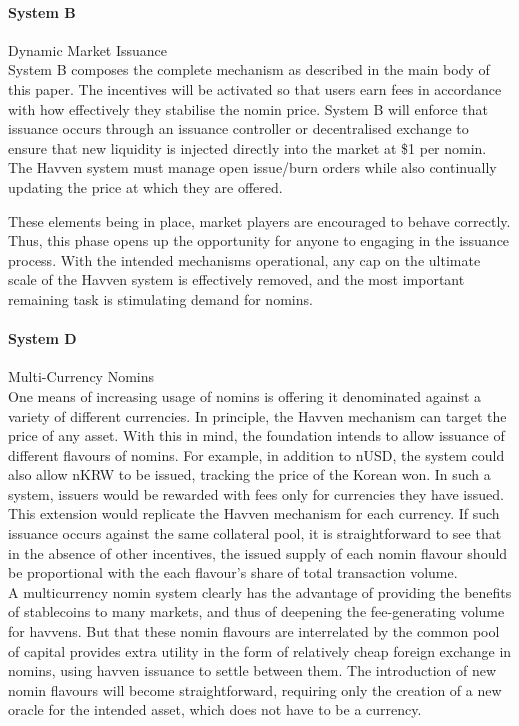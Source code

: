 \paragraph{System B} Dynamic Market Issuance \\

\noindent System B composes the complete mechanism as described in the main body
of this paper. The incentives will be activated so that users earn fees in
accordance with how effectively they stabilise the nomin price. 
System B will enforce that issuance occurs through an issuance controller or
decentralised exchange to ensure that new liquidity is injected directly
into the market at \$1 per nomin. The Havven system must manage open
issue/burn orders while also continually updating the price at which they are
offered.

\noindent These elements being in place, market players are encouraged to behave correctly.
Thus, this phase opens up the opportunity for anyone to engaging in the issuance process.
With the intended mechanisms operational, any cap on the ultimate scale of the Havven system
is effectively removed, and the most important remaining task is stimulating demand for nomins. \\


\paragraph{System D} Multi-Currency Nomins \\

\noindent One means of increasing usage of nomins is offering it
denominated against a variety of different currencies.
In principle, the Havven mechanism can target the price of any asset.
With this in mind, the foundation intends to allow issuance
of different flavours of nomins. For example, in addition to 
nUSD, the system could also allow nKRW to be issued, tracking
the price of the Korean won. In such a system, issuers would be
rewarded with fees only for currencies they have issued.
This extension would replicate the Havven mechanism for each currency. 
If such issuance occurs against the same collateral pool, it is
straightforward to see that in the absence of other incentives,
the issued supply of each nomin flavour should be proportional with the
each flavour's share of total transaction volume. \\

\noindent A multicurrency nomin system clearly has the advantage of providing
the benefits of stablecoins to many markets, and thus of deepening
the fee-generating volume for havvens. But that these nomin flavours
are interrelated by the common pool of capital provides extra utility
in the form of relatively cheap foreign exchange in nomins, using 
havven issuance to settle between them.
The introduction of new nomin flavours will become straightforward,
requiring only the creation of a new oracle for the intended asset,
which does not have to be a currency. \\

